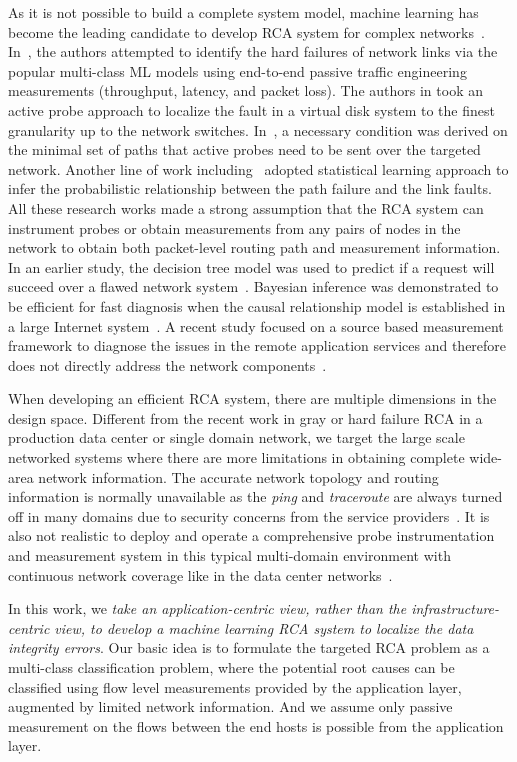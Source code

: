 As it is not possible to build a complete system model, machine learning has become the leading candidate to develop RCA system for complex networks~\cite{Boutaba:2018aa}.  
In~\cite{Link-JIoT-2019}, the authors attempted to identify the hard failures of network links via the popular multi-class ML models using end-to-end 
passive traffic engineering measurements (throughput, latency, and packet loss). The authors in \cite{DeepView:NSDI18} took an active probe approach to localize the fault in a 
virtual disk system to the finest granularity up to the network switches. In~\cite{netbouncer:nsdi18}, a necessary condition was derived on the minimal set of paths 
that active probes need to be sent over the targeted network. Another line of work including~\cite{kdd14,detector:atc17,arzani2018democratically} adopted statistical 
learning approach to infer the probabilistic relationship between the path failure and the link faults. All these research works made a strong assumption that the RCA system 
can instrument probes or obtain measurements from any pairs of nodes in the network to obtain both packet-level routing path and measurement information. In an earlier study, 
the decision tree model was used to predict if a request will succeed over a flawed network system~\cite{DT:2004}. Bayesian inference was demonstrated to be efficient for fast 
diagnosis when the causal relationship model is established in a large Internet system~\cite{BN-Internet:2007}. A recent study focused on a source based measurement framework 
to diagnose the issues in the remote application services and therefore does not directly address the network components~\cite{microrca:noms2020}.

When developing an efficient RCA system, there are multiple dimensions in the design space. Different from the recent work in 
gray or hard failure RCA  in a production data center or single domain network, we target the large scale networked systems 
where there are more limitations in obtaining complete wide-area network information. The accurate network topology and 
routing information is normally unavailable as the {\it ping} and {\it traceroute} are always turned off in many domains due to security concerns 
from the service providers~\cite{topology_obf_20}. It is also not realistic to deploy and operate a comprehensive probe instrumentation 
and measurement system in this typical multi-domain environment with continuous network coverage like in the data center networks~\cite{guo2015pingmesh}. 

In this work, we \emph {take an application-centric view, rather than the infrastructure-centric view, to develop 
a machine learning RCA system to localize the data integrity errors}. Our basic idea is to formulate the targeted RCA problem as a multi-class classification problem, 
where the potential root causes can be classified using flow level measurements provided by the application layer, augmented by limited network information.
And we assume only passive measurement on the flows between the end hosts is possible from the application layer. 

